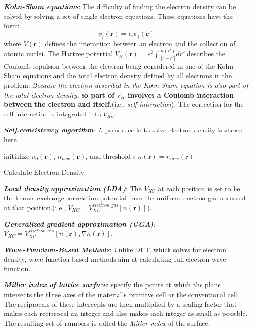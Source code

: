 \documentclass[12pt]{article}
\begin{document}
\textbf{\textit{Kohn-Sham equations}}: The difficulty of finding the electron density can be solved by solving a set of single-electron equations. These equations have the form:
\begin{equation}
    [-\frac{\hbar^2}{2m}\nabla^2+V(\boldsymbol{r})+V_H(\boldsymbol{r})+V_{XC}(\boldsymbol{r})]\psi_i(\boldsymbol{r})=\epsilon_i\psi_i(\boldsymbol{r})
\end{equation}
where $V(\boldsymbol{r})$ defines the interaction between an electron and the collection of atomic nuclei. The Hartree potential $V_H(\boldsymbol{r})=e^2\int\frac{n(r')}{|r-r'|}dr'$ describes the Coulomb repulsion between the electron being considered in one of the Kohn-Sham equations and the total electron density defined by all electrons in the problem. \textit{Because the electron described in the Kohn-Sham equation is also part of the total electron density,} \textbf{so part of $V_H$ involves a Coulomb interaction between the electron and itself.}(i.e., \emph{self-interaction}). The correction for the self-interaction is integrated into $V_{XC}$.

\textbf{\textit{Self-consistency algorithm}}: A pseudo-code to solve electron density is shown here.
\begin{algorithm}
\SetAlgoLined
{}
 initialize $n_0(\boldsymbol{r})$, $n_{new}(\boldsymbol{r})$, and threshold $\epsilon$\;
 $n(\boldsymbol{r})=n_{new}(\boldsymbol{r})$
\caption{Calculate Electron Density}
\end{algorithm}

\textbf{\textit{Local density approximation (LDA)}}: The $V_{XC}$ at each position is set to be the known exchange-correlation potential from the uniform electron gas observed at that position.(i.e., $V_{XC}=V_{XC}^{\textit{electron gas}}[n(\boldsymbol{r})]$).

\textbf{\textit{Generalized gradient approximation (GGA)}}: $V_{XC}=V_{XC}^{\textit{electron gas}}[n(\boldsymbol{r}), \nabla n(\boldsymbol{r})]$.

\textbf{\textit{Wave-Function-Based Methods}}: Unlike DFT, which solves for electron density, wave-function-based methods aim at calculating full electron wave function.

\textbf{\textit{Miller index of lattice surface}}: specify the points at which the plane intersects the three axes of the material's primitve cell or the conventional cell. The reciprocals of these intercepts are then multiplied by a scaling factor that makes each reciprocal an integer and also makes each integer as small as possible. The resulting set of numbers is called the \emph{Miller index} of the surface.
\end{document}

